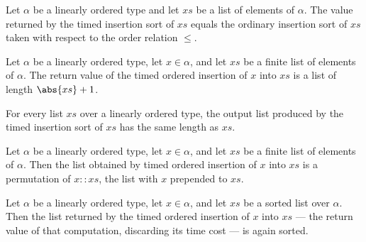 \begin{theorem}
\label{ret_insertionSort}
\leanok
{}
Let $\alpha$ be a linearly ordered type and let $xs$ be a list of elements of $\alpha$.
The value returned by the timed insertion sort of $xs$ equals the ordinary insertion
sort of $xs$ taken with respect to the order relation $\le$.
\end{theorem}

\begin{theorem}
\label{length_ret_insert}
\leanok
{}
Let $\alpha$ be a linearly ordered type, let $x \in \alpha$, and let $xs$ be a finite
list of elements of $\alpha$. The return value of the timed ordered insertion of $x$
into $xs$ is a list of length $\abs{xs} + 1$.
\end{theorem}

\begin{theorem}
\label{length_ret_insertionSort}
\leanok
{}
For every list $\mathit{xs}$ over a linearly ordered type, the output list produced by
the timed insertion sort of $\mathit{xs}$ has the same length as $\mathit{xs}$.
\end{theorem}

\begin{theorem}
\label{insert_perm}
\leanok
{}
Let $\alpha$ be a linearly ordered type, let $x \in \alpha$, and let $xs$ be a finite
list of elements of $\alpha$. Then the list obtained by timed ordered insertion of $x$
into $xs$ is a permutation of $x :: xs$, the list with $x$ prepended to $xs$.
\end{theorem}

\begin{theorem}
\label{insert_sorted}
\leanok
{}
Let $\alpha$ be a linearly ordered type, let $x \in \alpha$, and let $\mathit{xs}$ be a
sorted list over $\alpha$. Then the list returned by the timed ordered insertion of $x$
into $\mathit{xs}$ — the return value of that computation, discarding its time cost — is
again sorted.
\end{theorem}

